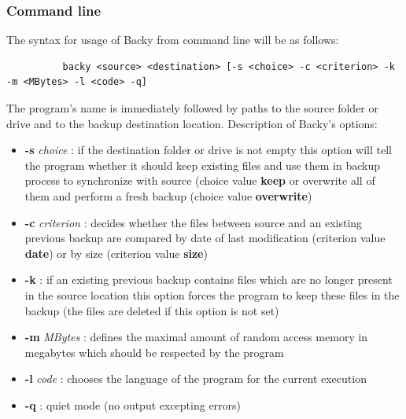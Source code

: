 \documentclass[a4paper]{article}
\begin{document}
      \subsubsection{Command line}
        The syntax for usage of Backy from command line will be as follows:
        \begin{lstlisting}
          backy <source> <destination> [-s <choice> -c <criterion> -k -m <MBytes> -l <code> -q]
        \end{lstlisting}
        The program's name is immediately followed by paths to the source folder or drive and to the backup destination location.
        Description of Backy's options:
        \begin{itemize}
          \item \textbf{-s} \textit{choice} : if the destination folder or drive is not empty this option will tell the program whether it should keep existing files and use them in backup process to synchronize with source (choice value \textbf{keep} or overwrite all of them and perform a fresh backup (choice value \textbf{overwrite})
          \item \textbf{-c} \textit{criterion} : decides whether the files between source and an existing previous backup are compared by date of last modification (criterion value \textbf{date}) or by size (criterion value \textbf{size})
          \item \textbf{-k} : if an existing previous backup contains files which are no longer present in the source location this option forces the program to keep these files in the backup (the files are deleted if this option is not set)
          \item \textbf{-m} \textit{MBytes} : defines the maximal amount of random access memory in megabytes which should be respected by the program
          \item \textbf{-l} \textit{code} : chooses the language of the program for the current execution
          \item \textbf{-q} : quiet mode (no output excepting errors)
        \end{itemize}
\end{document}
